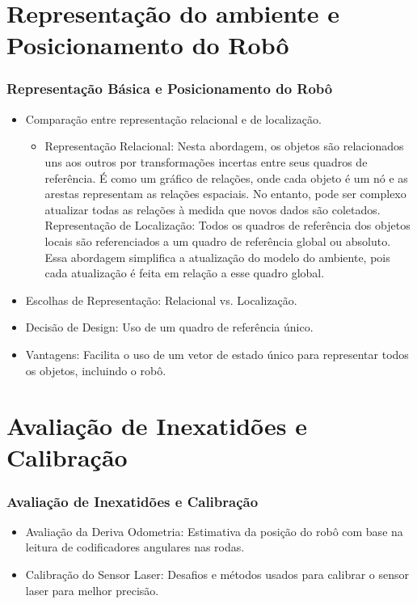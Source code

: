 \documentclass[xcolor=dvipsnames, aspectratio=169]{beamer}
\begin{document}
\section{Representação do ambiente e Posicionamento do Robô}
  \begin{frame}
  \frametitle{Representação Básica e Posicionamento do Robô}
  \begin{itemize}
      \item Comparação entre representação relacional e de localização.
      \begin{itemize}
        \item Representação Relacional: Nesta abordagem, os objetos são relacionados uns aos outros por transformações incertas entre seus quadros de referência. É como um gráfico de relações, onde cada objeto é um nó e as arestas representam as relações espaciais. No entanto, pode ser complexo atualizar todas as relações à medida que novos dados são coletados.
        Representação de Localização: Todos os quadros de referência dos objetos locais são referenciados a um quadro de referência global ou absoluto. Essa abordagem simplifica a atualização do modelo do ambiente, pois cada atualização é feita em relação a esse quadro global.
      \end{itemize}
      \item Escolhas de Representação: Relacional vs. Localização.
      \item Decisão de Design: Uso de um quadro de referência único.
      \item Vantagens: Facilita o uso de um vetor de estado único para representar todos os objetos, incluindo o robô.
  \end{itemize}
  \end{frame}
  

\section{Avaliação de Inexatidões e Calibração}
  \begin{frame}
  \frametitle{Avaliação de Inexatidões e Calibração}
  \begin{itemize}
      \item Avaliação da Deriva Odometria: Estimativa da posição do robô com base na leitura de codificadores angulares nas rodas.
      \item Calibração do Sensor Laser: Desafios e métodos usados para calibrar o sensor laser para melhor precisão.
  \end{itemize}
  \end{frame}
  
\end{document}
